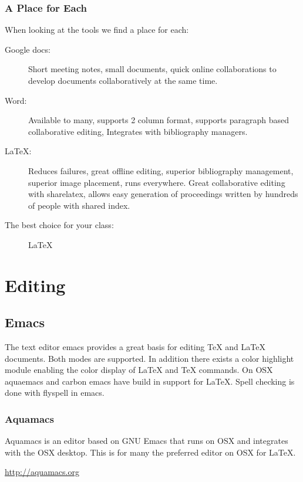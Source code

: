 \subsubsection{A Place for Each}\label{a-place-for-each}

When looking at the tools we find a place for each:

\begin{description}
\item[Google docs:]
Short meeting notes, small documents, quick online collaborations to
develop documents collaboratively at the same time.
\item[Word:]
Available to many, supports 2 column format, supports paragraph based
collaborative editing, Integrates with bibliography managers.
\item[LaTeX:]
Reduces failures, great offline editing, superior bibliography
management, superior image placement, runs everywhere. Great
collaborative editing with sharelatex, allows easy generation of
proceedings written by hundreds of people with shared index.
\item[The best choice for your class:]
LaTeX
\end{description}

\section{Editing}\label{editing}

\subsection{Emacs}\label{emacs}

The text editor emacs provides a great basis for editing TeX and LaTeX
documents. Both modes are supported. In addition there exists a color
highlight module enabling the color display of LaTeX and TeX commands.
On OSX aquaemacs and carbon emacs have build in support for LaTeX. Spell
checking is done with flyspell in emacs.

\subsubsection{Aquamacs}

Aquamacs is an editor based on GNU Emacs that runs on OSX and
integrates with the OSX desktop. This is for many the preferred editor
on OSX for \LaTeX.

\url{http://aquamacs.org}


